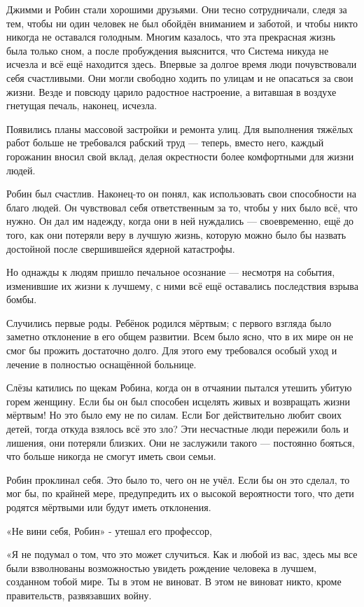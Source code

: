 \documentclass[a5paper, 9pt,
final, openany, twoside=true]{memoir}
\begin{document}
Джимми и Робин стали хорошими друзьями. Они тесно сотрудничали, следя за тем, чтобы ни один человек не был обойдён вниманием и заботой, и чтобы никто никогда не оставался голодным. Многим казалось, что эта прекрасная жизнь была только сном, а после пробуждения выяснится, что Система никуда не исчезла и всё ещё находится здесь. Впервые за долгое время люди почувствовали себя счастливыми. Они могли свободно ходить по улицам и не опасаться за свои жизни. Везде и повсюду царило радостное настроение, а витавшая в воздухе гнетущая печаль, наконец, исчезла.

Появились планы массовой застройки и ремонта улиц. Для выполнения тяжёлых работ больше не требовался рабский труд — теперь, вместо него, каждый горожанин вносил свой вклад, делая окрестности более комфортными для жизни людей.\bigskip

Робин был счастлив. Наконец-то он понял, как использовать свои способности на благо людей. Он чувствовал себя ответственным за то, чтобы у них было всё, что нужно. Он дал им надежду, когда они в ней нуждались — своевременно, ещё до того, как они потеряли веру в лучшую жизнь, которую можно было бы назвать достойной после свершившейся ядерной катастрофы.\bigskip

Но однажды к людям пришло печальное осознание — несмотря на события, изменившие их жизни к лучшему, с ними всё ещё оставались последствия взрыва бомбы.

Случились первые роды. Ребёнок родился мёртвым; с первого взгляда было заметно отклонение в его общем развитии. Всем было ясно, что в их мире он не смог бы прожить достаточно долго. Для этого ему требовался особый уход и лечение в полностью оснащённой больнице.

Слёзы катились по щекам Робина, когда он в отчаянии пытался утешить убитую горем женщину. Если бы он был способен исцелять живых и возвращать жизни мёртвым! Но это было ему не по силам. Если Бог действительно любит своих детей, тогда откуда взялось всё это зло? Эти несчастные люди пережили боль и лишения, они потеряли близких. Они не заслужили такого — постоянно бояться, что больше никогда не смогут иметь свои семьи.

Робин проклинал себя. Это было то, чего он не учёл. Если бы он это сделал, то мог бы, по крайней мере, предупредить их о высокой вероятности того, что дети родятся мёртвыми или будут иметь отклонения.

«Не вини себя, Робин» - утешал его профессор,

«Я не подумал о том, что это может случиться. Как и любой из вас, здесь мы все были взволнованы возможностью увидеть рождение человека в лучшем, созданном тобой мире. Ты в этом не виноват. В этом не виноват никто, кроме правительств, развязавших войну.
\end{document}
